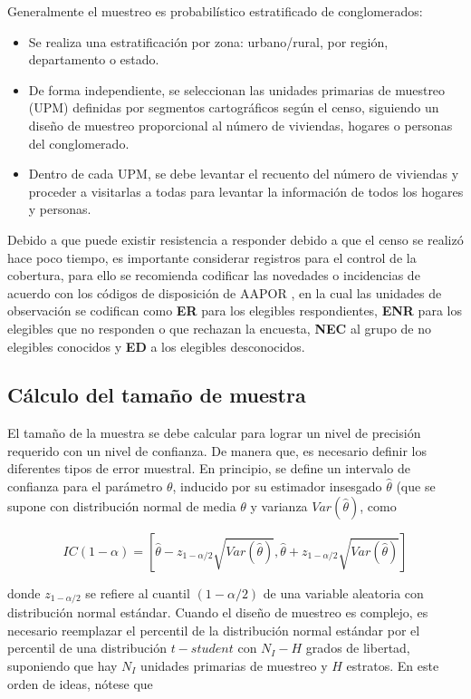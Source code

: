 \documentclass[
  12pt,
]{book}
\providecommand{\tightlist}{%
  \setlength{\itemsep}{0pt}\setlength{\parskip}{0pt}}
\begin{document}
Generalmente el muestreo es probabilístico estratificado de conglomerados:

\begin{itemize}
\tightlist
\item
  Se realiza una estratificación por zona: urbano/rural, por región, departamento o estado.
\item
  De forma independiente, se seleccionan las unidades primarias de muestreo (UPM) definidas por segmentos cartográficos según el censo, siguiendo un diseño de muestreo proporcional al número de viviendas, hogares o personas del conglomerado.
\item
  Dentro de cada UPM, se debe levantar el recuento del número de viviendas y proceder a visitarlas a todas para levantar la información de todos los hogares y personas.
\end{itemize}

Debido a que puede existir resistencia a responder debido a que el censo se realizó hace poco tiempo, es importante considerar registros para el control de la cobertura, para ello se recomienda codificar las novedades o incidencias de acuerdo con los códigos de disposición de AAPOR \citep{american2016standard}, en la cual las unidades de observación se codifican como \textbf{ER} para los elegibles respondientes, \textbf{ENR} para los elegibles que no responden o que rechazan la encuesta, \textbf{NEC} al grupo de no elegibles conocidos y \textbf{ED} a los elegibles desconocidos.

\subsection{Cálculo del tamaño de muestra}\label{cuxe1lculo-del-tamauxf1o-de-muestra}

El tamaño de la muestra se debe calcular para lograr un nivel de precisión requerido con un nivel de confianza. De manera que, es necesario definir los diferentes tipos de error muestral. En principio, se define un intervalo de confianza para el parámetro \(\theta\), inducido por su estimador insesgado \(\hat{\theta}\) (que se supone con distribución normal de media \(\theta\) y varianza \(Var(\hat{\theta})\), como

\[
IC(1-\alpha)=\left[\hat{\theta}-z_{1-\alpha / 2}\sqrt{ Var(\hat{\theta})},\hat{\theta}+z_{1-\alpha / 2}\sqrt{Var(\hat{\theta})}\right]
\]

donde \(z_{1-\alpha / 2}\) se refiere al cuantil \((1-\alpha / 2)\) de una variable aleatoria con distribución normal estándar. Cuando el diseño de muestreo es complejo, es necesario reemplazar el percentil de la distribución normal estándar por el percentil de una distribución \(t-student\) con \(N_I - H\) grados de libertad, suponiendo que hay \(N_I\) unidades primarias de muestreo y \(H\) estratos. En este orden de ideas, nótese que
\end{document}
